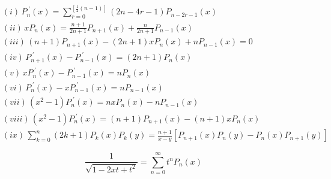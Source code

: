 \[\begin{equation} \label{thrm3.8} {\begin{aligned} & (i)\, P_n^{\;'}(x) = \sum_{r=0}^{\left[ \frac{1}{2}(n-1) \right]}(2n-4r-1)P_{n-2r-1}(x) \\& (ii)\, xP_n(x) = \frac{n+1}{2n+1}P_{n+1}(x) + \frac{n}{2n+1}P_{n-1}(x) \\& (iii)\, (n+1)P_{n+1}(x) - (2n+1)xP_n(x) + nP_{n-1}(x) = 0 \\& (iv)\, P_{n+1}^{\; '}(x) - P_{n-1}^{\; '}(x) = (2n+1)P_n(x) \\& (v)\, xP_n^{\; '}(x) - P_{n-1}^{\; '}(x) = nP_n(x) \\& (vi)\, P_n^{\; '}(x) - xP_{n-1}^{\; '}(x) = nP_{n-1}(x) \\& (vii)\, (x^2-1)P_{n}^{\; '}(x) = nxP_n(x) - nP_{n-1}(x) \\& (viii)\, (x^2-1)P_{n}^{\; '}(x) = (n+1)P_{n+1}(x) - (n+1)xP_n(x) \\& (ix)\, \sum_{k=0}^n(2k+1)P_k(x)P_k(y) = \frac{n+1}{x-y}\left[ P_{n+1}(x)P_n(y) - P_n(x)P_{n+1}(y) \right] \end{aligned}} \end{equation}\]

\[\begin{equation} \label{thrm3.1} {\frac {1}{\sqrt {1-2xt+t^{2}}}}=\sum _{n=0}^{\infty }t^{n}P_{n}(x) \end{equation}\]
